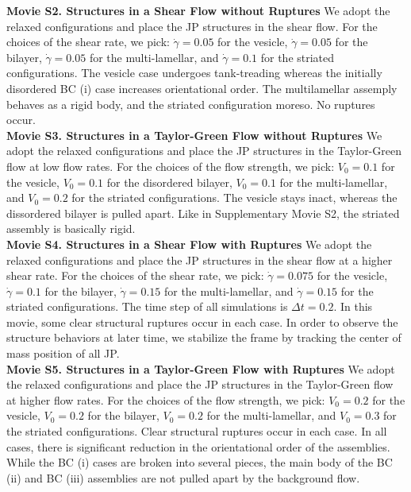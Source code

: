 \noindent
{\bf Movie S2. Structures in a Shear Flow without Ruptures} 
We adopt the relaxed configurations and place the JP structures in the
shear flow. For the choices of the shear rate, we pick: $\dot\gamma =
0.05$ for the vesicle, $\dot\gamma = 0.05$ for the bilayer, $\dot\gamma
= 0.05$ for the multi-lamellar, and $\dot\gamma = 0.1$ for the striated
configurations. The vesicle case undergoes tank-treading whereas the
initially disordered BC (i) case increases orientational order. The
multilamellar assemply behaves as a rigid body, and the striated
configuration moreso. No ruptures occur. \\



\noindent
{\bf Movie S3. Structures in a Taylor-Green Flow without Ruptures} 
We adopt the relaxed configurations and place the JP structures in the
Taylor-Green flow at low flow rates. For the choices of the flow
strength, we pick: $V_0 = 0.1$ for the vesicle, $V_0 = 0.1$ for the
disordered bilayer, $V_0 = 0.1$ for the multi-lamellar, and $V_0 = 0.2$
for the striated configurations. The vesicle stays inact, whereas the
dissordered bilayer is pulled apart. Like in Supplementary Movie S2, the
striated assembly is basically rigid. \\


\noindent
{\bf Movie S4. Structures in a Shear Flow with Ruptures} 
We adopt the relaxed configurations and place the JP structures in the
shear flow at a higher shear rate. For the choices of the shear rate, we
pick: $\dot\gamma = 0.075$ for the vesicle, $\dot\gamma = 0.1$ for the
bilayer, $\dot\gamma = 0.15$ for the multi-lamellar, and $\dot\gamma =
0.15$ for the striated configurations. The time step of all simulations
is $\Delta t=0.2$. In this movie, some clear structural ruptures occur
in each case. In order to observe the structure behaviors at later time,
we stabilize the frame by tracking the center of mass position of all
JP. \\


\noindent
{\bf Movie S5. Structures in a Taylor-Green Flow with Ruptures} 
We adopt the relaxed configurations and place the JP structures in the
Taylor-Green flow at higher flow rates. For the choices of the flow
strength, we pick: $V_0 = 0.2$ for the vesicle, $V_0 = 0.2$ for the
bilayer, $V_0 = 0.2$ for the multi-lamellar, and $V_0 = 0.3$ for the
striated configurations. Clear structural ruptures occur in each case.
In all cases, there is significant reduction in the orientational order
of the assemblies. While the BC (i) cases are broken into several
pieces, the main body of the BC (ii) and BC (iii) assemblies are not
pulled apart by the background flow. 

